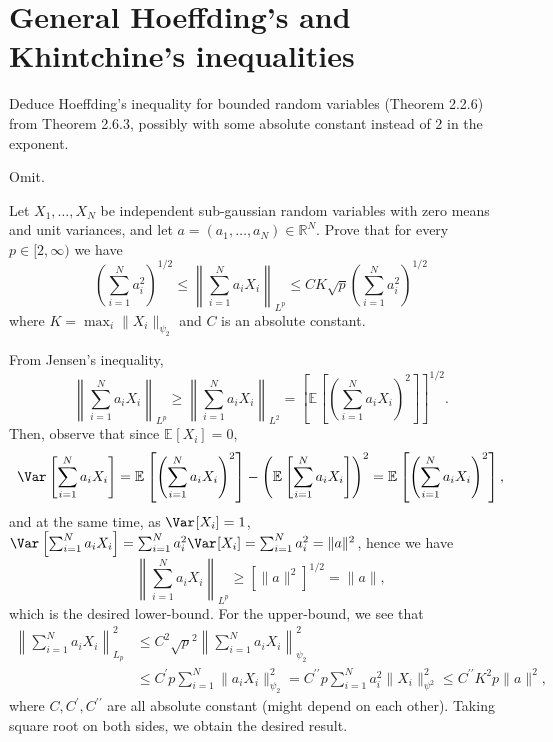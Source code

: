 \section{General Hoeffding's and Khintchine's inequalities}
\begin{problem*}[Exercise 2.6.4]\label{ex2.6.4}
	Deduce Hoeffding's inequality for bounded random variables (Theorem 2.2.6) from Theorem 2.6.3, possibly with some absolute constant instead of \(2\) in the exponent.
\end{problem*}
\begin{answer}
	Omit.
\end{answer}

\begin{problem*}[Exercise 2.6.5]\label{ex2.6.5}
	Let \(X_1, \dots, X_N \) be independent sub-gaussian random variables with zero means and unit variances, and let \(a = (a_1, \dots , a_N) \in \mathbb{R} ^N\). Prove that for every \(p \in [2, \infty )\) we have
	\[
		\left( \sum_{i=1}^{N} a_i^2 \right) ^{1 / 2}
		\leq \left\lVert \sum_{i=1}^{N} a_i X_i \right\rVert _{L^p}
		\leq CK \sqrt{p} \left( \sum_{i=1}^{N} a_i^2 \right) ^{1 / 2}
	\]
	where \(K = \max _i \lVert X_i \rVert _{\psi _2}\) and \(C\) is an absolute constant.
\end{problem*}
\begin{answer}
	From Jensen's inequality,
	\[
		\left\lVert \sum_{i=1}^{N} a_i X_i \right\rVert _{L^p}
		\geq \left\lVert \sum_{i=1}^{N} a_i X_i \right\rVert _{L^2}
		= \left[ \mathbb{E}_{}\left[ \left( \sum_{i=1}^{N} a_i X_i \right) ^2 \right] \right] ^{1 / 2}.
	\]
	Then, observe that since \(\mathbb{E}_{}[X_i] = 0\),
	\[
		\Var_{}\left[\sum_{i=1}^{N} a_i X_i\right]
		= \mathbb{E}_{}\left[ \left( \sum_{i=1}^{N} a_i X_i \right) ^2 \right] - \left( \mathbb{E}_{}\left[\sum_{i=1}^{N} a_i X_i\right] \right) ^2
		= \mathbb{E}_{}\left[ \left( \sum_{i=1}^{N} a_i X_i \right) ^2 \right],
	\]
	and at the same time, as \(\Var_{}[X_i] = 1\), \(\Var_{}\left[\sum_{i=1}^{N} a_i X_i\right] = \sum_{i=1}^{N} a_i^2 \Var_{}[X_i] = \sum_{i=1}^{N} a_i^2 = \lVert a \rVert ^2\), hence we have
	\[
		\left\lVert \sum_{i=1}^{N} a_i X_i \right\rVert _{L^p}
		\geq \left[ \lVert a \rVert ^2 \right] ^{1 / 2}
		= \lVert a \rVert,
	\]
	which is the desired lower-bound. For the upper-bound, we see that
	\[
		\begin{split}
			\left\lVert \sum_{i=1}^{N} a_i X_i \right\rVert _{L_p}^2
			 & \leq C^2 \sqrt{p}^2 \left\lVert \sum_{i=1}^{N} a_i X_i \right\rVert _{\psi _2}^2 \\
			 & \leq C^{\prime} p \sum_{i=1}^{N} \lVert a_i X_i \rVert _{\psi _2}^2
			= C^{\prime\prime} p \sum_{i=1}^{N} a_i^2 \lVert X_i \rVert _{\psi ^2}^2
			\leq C^{\prime\prime} K^2 p \lVert a \rVert ^2,
		\end{split}
	\]
	where \(C, C^{\prime} , C^{\prime\prime} \) are all absolute constant (might depend on each other). Taking square root on both sides, we obtain the desired result.
\end{answer}

